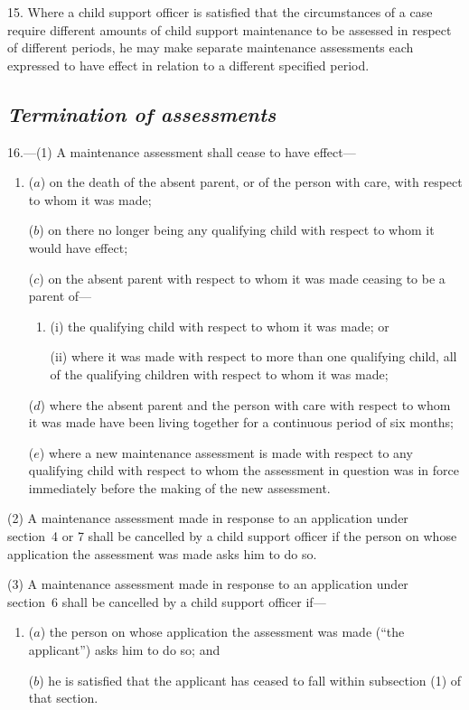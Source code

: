 \documentclass[12pt,a4paper]{article}
\begin{document}
15. Where a child support officer is satisfied that the circumstances of a case require different amounts of child support maintenance to be assessed in respect of different periods, he may make separate maintenance assessments each expressed to have effect in relation to a different specified period.


\subsection*{\itshape Termination of assessments}

16.---(1) A maintenance assessment shall cease to have effect—
\begin{enumerate}\item[]
($a$) on the death of the absent parent, or of the person with care, with respect to whom it was made;

($b$) on there no longer being any qualifying child with respect to whom it would have effect;

($c$) on the absent parent with respect to whom it was made ceasing to be a parent of—
\begin{enumerate}\item[]
(i) the qualifying child with respect to whom it was made; or

(ii) where it was made with respect to more than one qualifying child, all of the qualifying children with respect to whom it was made;
\end{enumerate}

($d$) where the absent parent and the person with care with respect to whom it was made have been living together for a continuous period of six months;

($e$) where a new maintenance assessment is made with respect to any qualifying child with respect to whom the assessment in question was in force immediately before the making of the new assessment.
\end{enumerate}

(2) A maintenance assessment made in response to an application under section~4 or 7 shall be cancelled by a child support officer if the person on whose application the assessment was made asks him to do so.

(3) A maintenance assessment made in response to an application under section~6 shall be cancelled by a child support officer if—
\begin{enumerate}\item[]
($a$) the person on whose application the assessment was made (“the applicant”) asks him to do so; and

($b$) he is satisfied that the applicant has ceased to fall within subsection (1)  of that section.
\end{enumerate}
\end{document}
